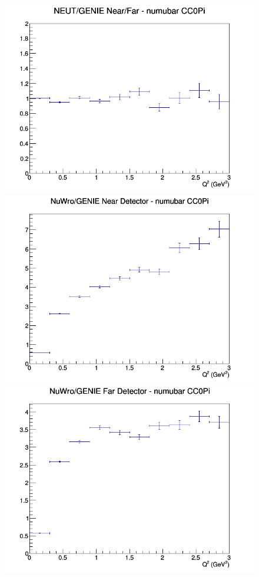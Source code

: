 \documentclass[12pt]{article}
\begin{document}
\begin{figure}[h]
\endminipage
{}
\includegraphics[width=\linewidth]{eff_Q2/GAr/ratios/CC0Pi_NEUT_GENIE_numubar_NF_Q2.png}
\endminipage
\newline
{}
\includegraphics[width=\linewidth]{eff_Q2/GAr/ratios/CC0Pi_NuWro_GENIE_numubar_near_Q2.png}
\endminipage
{}
\includegraphics[width=\linewidth]{eff_Q2/GAr/ratios/CC0Pi_NuWro_GENIE_numubar_far_Q2.png}

\end{figure}
\end{document}

